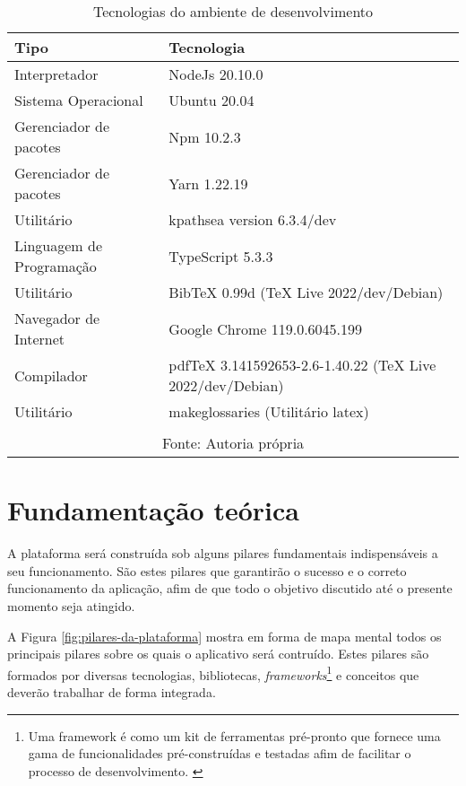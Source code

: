 \begin{table}[H]
    \centering
    \caption{Tecnologias do ambiente de desenvolvimento}
    \label{tbl:tecnologias-ambiente}
    \renewcommand{\arraystretch}{1.5}
    \begin{tabular}{p{6.4000cm} p{9.6000cm}}
        \hline
        \textbf{Tipo} & \textbf{Tecnologia} \\
        \hline
        Interpretador & NodeJs 20.10.0 \\
		Sistema Operacional & Ubuntu 20.04 \\
		Gerenciador de pacotes & Npm 10.2.3 \\
		Gerenciador de pacotes & Yarn 1.22.19 \\
		Utilitário & kpathsea version 6.3.4/dev \\
		Linguagem de Programação & TypeScript 5.3.3 \\
		Utilitário & BibTeX 0.99d (TeX Live 2022/dev/Debian) \\
		Navegador de Internet & Google Chrome 119.0.6045.199 \\
		Compilador & pdfTeX 3.141592653-2.6-1.40.22 (TeX Live 2022/dev/Debian) \\
		Utilitário & makeglossaries (Utilitário \acrshort{latex}) \\
        \hline
        \\\multicolumn{2}{c}{\fontsize{10pt}{12pt}Fonte: Autoria própria}
    \end{tabular}
\end{table}

\chapter{Fundamentação teórica}

A plataforma será construída sob alguns pilares fundamentais indispensáveis
a seu funcionamento. São estes pilares que garantirão o sucesso e o correto
funcionamento da aplicação, afim de que todo o objetivo discutido até o
presente momento seja atingido.

A
Figura \ref{fig:pilares-da-plataforma}
mostra em forma de mapa mental todos os principais pilares sobre os quais
o aplicativo será contruído. Estes pilares são formados por diversas
tecnologias, bibliotecas,
\textit{frameworks}\footnote{Uma framework é como um kit de ferramentas pré-pronto que fornece uma gama
    de funcionalidades pré-construídas e testadas afim de facilitar o processo
    de desenvolvimento. \cite{amazon-framework}
}
e conceitos que deverão trabalhar de forma integrada.

